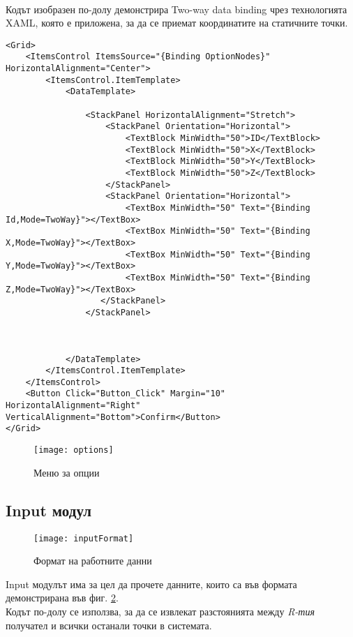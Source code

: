 \\

Кодът изобразен по-долу демонстрира Two-way data binding чрез технологията XAML, която е приложена, за да се приемат координатите на статичните точки.

\begin{lstlisting}
<Grid>
    <ItemsControl ItemsSource="{Binding OptionNodes}" HorizontalAlignment="Center">
        <ItemsControl.ItemTemplate>
            <DataTemplate>

                <StackPanel HorizontalAlignment="Stretch">
                    <StackPanel Orientation="Horizontal">
                        <TextBlock MinWidth="50">ID</TextBlock>
                        <TextBlock MinWidth="50">X</TextBlock>
                        <TextBlock MinWidth="50">Y</TextBlock>
                        <TextBlock MinWidth="50">Z</TextBlock>
                    </StackPanel>   
                    <StackPanel Orientation="Horizontal">
                        <TextBox MinWidth="50" Text="{Binding Id,Mode=TwoWay}"></TextBox>
                        <TextBox MinWidth="50" Text="{Binding X,Mode=TwoWay}"></TextBox>
                        <TextBox MinWidth="50" Text="{Binding Y,Mode=TwoWay}"></TextBox>
                        <TextBox MinWidth="50" Text="{Binding Z,Mode=TwoWay}"></TextBox>
                   </StackPanel>
                </StackPanel>
                

                
            </DataTemplate>
        </ItemsControl.ItemTemplate>
    </ItemsControl>
    <Button Click="Button_Click" Margin="10"  HorizontalAlignment="Right" VerticalAlignment="Bottom">Confirm</Button>
</Grid>
\end{lstlisting}

\begin{figure}
   \centerline{\texttt{[image: options]}}
    \caption{Меню за опции}
    \label{fig:options}
\end{figure}

\pagebreak

\subsection{Input модул}
\begin{figure}
   \centerline{\texttt{[image: inputFormat]}}
    \caption{Формат на работните данни}
    \label{fig:input}
\end{figure}

Input модулът има за цел да прочете данните, които са във формата демонстрирана във фиг. \ref{fig:input}.\\ Кодът по-долу се използва, за да се извлекат разстоянията между \textit{R-тия} получател и всички останали точки в системата.

